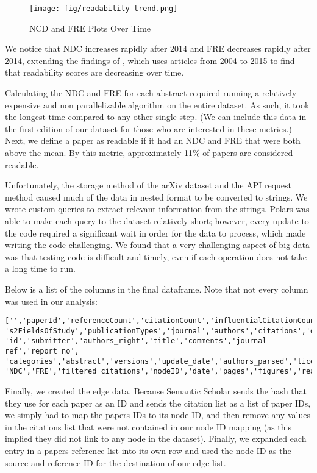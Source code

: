 \documentclass[final]{article}
\begin{document}
\begin{figure}[!hbt]
  \centering
 \texttt{[image: fig/readability-trend.png]}
  \caption{NCD and FRE Plots Over Time}
 \end{figure} 

We notice that NDC increases rapidly after 2014 and FRE decreases rapidly after 2014, extending the findings of \cite{readability}, which uses articles from 2004 to 2015 to find that readability scores are decreasing over time.

Calculating the NDC and FRE for each abstract required running a relatively expensive and non parallelizable algorithm on the entire dataset. As such, it took the longest time compared to any other single step.
(We can include this data in the first edition of our dataset for those who are interested in these metrics.) Next, we define a paper as readable if it had an NDC and FRE that were both above the mean. By this metric, approximately 11\% of papers are considered readable. 

Unfortunately, the storage method of the arXiv dataset and the API request method caused much of the data in nested format to be converted to strings. We wrote custom queries to extract relevant information from the strings. Polars was able to make each query to the dataset relatively short; however, every update to the code required a significant wait in order for the data to process, which made writing the code challenging. We found that a very challenging aspect of big data was that testing code is difficult and timely, even if each operation does not take a long time to run. 


\newpage

Below is a list of the columns in the final dataframe. Note that not every column was used in our analysis:

\begin{verbatim}
['','paperId','referenceCount','citationCount','influentialCitationCount', 
's2FieldsOfStudy','publicationTypes','journal','authors','citations','doi',
'id','submitter','authors_right','title','comments','journal-ref','report_no',
'categories','abstract','versions','update_date','authors_parsed','license',
'NDC','FRE','filtered_citations','nodeID','date','pages','figures','readable']
\end{verbatim}

Finally, we created the edge data. Because Semantic Scholar sends the hash that they use for each paper as an ID and sends the citation list as a list of paper IDs, we simply had to map  the papers IDs to its node ID, and then remove any values in the citations list that were not contained in our node ID mapping (as this implied they did not link to any node in the dataset). Finally, we expanded each entry in a papers reference list into its own row and used the node ID as the source and reference ID for the destination of our edge list. 
\end{document}
